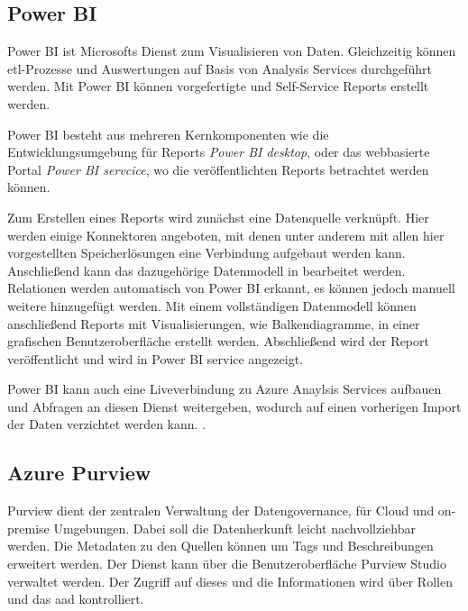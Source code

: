 \subsection{Power BI} \label{sec:grundlagen:azure_dienste:powerBI}
Power BI ist Microsofts Dienst zum Visualisieren von Daten. Gleichzeitig können \ac{etl}-Prozesse und Auswertungen auf Basis von Analysis Services durchgeführt werden. Mit Power BI können vorgefertigte und Self-Service Reports erstellt werden.

Power BI besteht aus mehreren Kernkomponenten wie die Entwicklungsumgebung für Reports \textit{Power BI desktop}, oder das webbasierte Portal \textit{Power BI servcice}, wo die veröffentlichten Reports betrachtet werden können.

Zum Erstellen eines Reports wird zunächst eine Datenquelle verknüpft. Hier werden einige Konnektoren angeboten, mit denen unter anderem mit allen hier vorgestellten Speicherlösungen eine Verbindung aufgebaut werden kann. Anschließend kann das dazugehörige Datenmodell in bearbeitet werden. Relationen werden automatisch von Power BI erkannt, es können jedoch manuell weitere hinzugefügt werden. Mit einem vollständigen Datenmodell können anschließend Reports mit Visualisierungen, wie Balkendiagramme, in einer grafischen Benutzeroberfläche erstellt werden. Abschließend wird der Report veröffentlicht und wird in Power BI service angezeigt.

Power BI kann auch eine Liveverbindung zu Azure Anaylsis Services aufbauen und Abfragen an diesen Dienst weitergeben, wodurch auf einen vorherigen Import der Daten verzichtet werden kann.
\cite{how_beyond_2020}.











\subsection{Azure Purview} \label{sec:grundlagen:azure_dienste:purview}
Purview dient der zentralen Verwaltung der Datengovernance, für Cloud und on-premise Umgebungen. Dabei soll die Datenherkunft leicht nachvollziehbar werden. Die Metadaten zu den Quellen können um Tags und Beschreibungen erweitert werden. Der Dienst kann über die Benutzeroberfläche Purview Studio verwaltet werden. Der Zugriff auf dieses und die Informationen wird über Rollen und das \ac{aad} kontrolliert.


